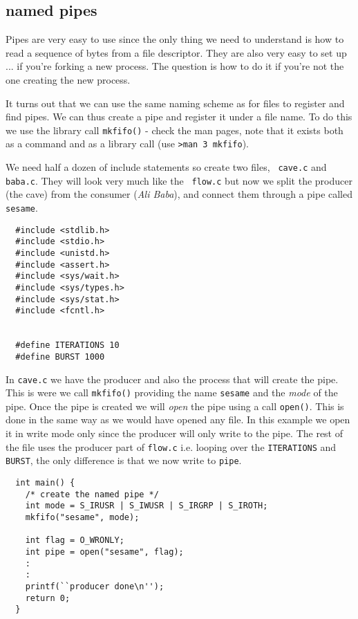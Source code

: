 \documentclass[a4paper,11pt]{article}
\begin{document}
\subsection{named pipes}

Pipes are very easy to use since the only thing we need to understand
is how to read a sequence of bytes from a file descriptor. They are
also very easy to set up ... if you're forking a new process. The
question is how to do it if you're not the one creating the new
process. 

It turns out that we can use the same naming scheme as for files to
register and find pipes. We can thus create a pipe and register it
under a file name. To do this we use the library call {\tt mkfifo()} -
check the man pages, note that it exists both as a command and as a
library call (use {\tt >man 3 mkfifo}). 

We need half a dozen of include statements so create two files, {\tt
  cave.c} and {\tt baba.c}. They will look very much like the {\tt
  flow.c} but now we split the producer (the cave) from the consumer
({\em Ali Baba}), and connect them through a pipe called {\tt sesame}. 

\begin{lstlisting}
  #include <stdlib.h>
  #include <stdio.h>
  #include <unistd.h>
  #include <assert.h>
  #include <sys/wait.h>
  #include <sys/types.h>
  #include <sys/stat.h>
  #include <fcntl.h>


  #define ITERATIONS 10
  #define BURST 1000
\end{lstlisting}

In {\tt cave.c} we have the producer and also the process that will
create the pipe. This is were we call {\tt mkfifo()} providing the
name {\tt sesame} and the {\em mode} of the pipe. Once the pipe is
created we will {\em open} the pipe using a call {\tt open()}. This is
done in the same way as we would have opened any file. In this example
we open it in write mode only since the producer will only write to
the pipe. The rest of the file uses the producer part of {\tt flow.c}
i.e. looping over the {\tt ITERATIONS} and {\tt BURST}, the only
difference is that we now write to {\tt pipe}.

\begin{lstlisting}
  int main() {
    /* create the named pipe */
    int mode = S_IRUSR | S_IWUSR | S_IRGRP | S_IROTH;
    mkfifo("sesame", mode);  

    int flag = O_WRONLY;  
    int pipe = open("sesame", flag);
    :  
    :
    printf(``producer done\n'');
    return 0;
  }
\end{lstlisting}
\end{document}

